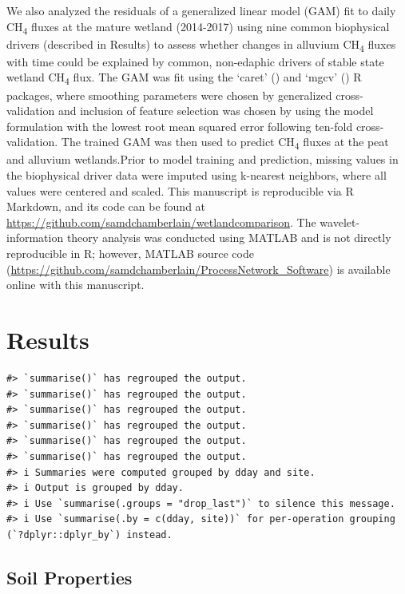 \documentclass[
  12pt,
]{article}
\begin{document}
We also analyzed the residuals of a generalized linear model (GAM) fit
to daily CH\textsubscript{4} fluxes at the mature wetland (2014-2017)
using nine common biophysical drivers (described in Results) to assess
whether changes in alluvium CH\textsubscript{4} fluxes with time could
be explained by common, non-edaphic drivers of stable state wetland
CH\textsubscript{4} flux. The GAM was fit using the `caret'
() and `mgcv'
() R packages, where smoothing parameters
were chosen by generalized cross-validation and inclusion of feature
selection was chosen by using the model formulation with the lowest root
mean squared error following ten-fold cross-validation. The trained GAM
was then used to predict CH\textsubscript{4} fluxes at the peat and
alluvium wetlands.Prior to model training and prediction, missing values
in the biophysical driver data were imputed using k-nearest neighbors,
where all values were centered and scaled. This manuscript is
reproducible via R Markdown, and its code can be found at
\url{https://github.com/samdchamberlain/wetlandcomparison}. The
wavelet-information theory analysis was conducted using MATLAB and is
not directly reproducible in R; however, MATLAB source code
(\url{https://github.com/samdchamberlain/ProcessNetwork_Software}) is
available online with this manuscript.

\section{Results}\label{results}

\begin{verbatim}
#> `summarise()` has regrouped the output.
#> `summarise()` has regrouped the output.
#> `summarise()` has regrouped the output.
#> `summarise()` has regrouped the output.
#> `summarise()` has regrouped the output.
#> `summarise()` has regrouped the output.
#> i Summaries were computed grouped by dday and site.
#> i Output is grouped by dday.
#> i Use `summarise(.groups = "drop_last")` to silence this message.
#> i Use `summarise(.by = c(dday, site))` for per-operation grouping (`?dplyr::dplyr_by`) instead.
\end{verbatim}

\subsection{Soil Properties}\label{soil-properties}
\end{document}
